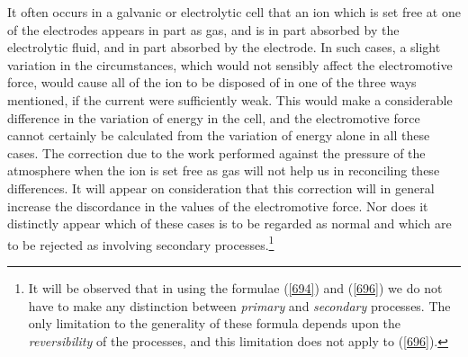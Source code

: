 \documentclass[12pt]{article}
\begin{document}
It often occurs in a galvanic or electrolytic cell that an ion which is set free at one of the electrodes appears in part as gas, and is in part absorbed by the electrolytic fluid, and in part absorbed by the electrode.   In such cases, a slight variation in the circumstances, which would not sensibly affect the electromotive force, would cause all of the ion to be disposed of in one of the three ways mentioned, if the current were sufficiently weak. This would make a considerable difference in the variation of energy in the cell, and the electromotive force cannot certainly be calculated from the variation of energy alone in all these cases. The correction due to the work performed against the pressure of the atmosphere when the ion is set free as gas will not help us in reconciling these differences. It will appear on consideration that this correction will in general increase the discordance in the values of the electromotive force. Nor does it distinctly appear which of these cases is to be regarded as normal and which are to be rejected as involving secondary processes.\footnote{It will be observed that in using the formulae (\ref{694}) and (\ref{696}) we do not have to make any distinction between \textit{primary} and \textit{secondary} processes. The only limitation to the generality of these formula depends upon the \textit{reversibility} of the processes, and this limitation does not apply to (\ref{696}).}
\end{document}
